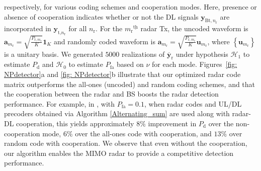 \documentclass[10pt,journal]{IEEEtran}
\newcommand{\paren}[1]{\left({#1}\right)}
\newcommand{\braces}[1]{{\left\{ {#1}\right\}}}
\newcommand{\ith}[1]    {{#1}^{\underline{\text{th}}}}
\newcommand{\rr}{_\mathrm{r}}
\theoremstyle{definition}
\begin{document}
		respectively, for various coding schemes and cooperation modes. Here, presence or absence of cooperation indicates whether or not the DL signals $\mathbf{y}_{\textrm{Bt},n\rr}$ are incorporated in $\mathbf{y}_{\textrm{t,}n\rr}$ for all $n\rr$. For the $\ith{m\rr}$ radar Tx, the uncoded waveform is $\mathbf{a}_{m\rr}=\sqrt{\frac{\mathit{P}_{\textrm{r},m\rr}}{\mathit{K}}}\mathbf{1}_{\mathit{K}}$ and randomly coded waveform is  $\mathbf{a}_{m\rr}=\sqrt{\frac{\mathit{P}_{\textrm{r},m\rr}}{\mathit{K}}}\mathbf{u}_{m\rr}$, where $\braces{\mathbf{u}_{m\rr}}$ is a unitary basis. We generated $5000$ realizations of $\overline{\mathbf{y}}_{\textrm{r}}$ under hypothesis $\mathcal{H}_1$ to estimate $\mathit{P}_{\textrm{d}}$ and $\mathcal{H}_0$ to estimate $\mathit{P}_{\textrm{fa}}$ based on $\nu$ for each mode. Figures~\ref{fig: NPdetector}a and \ref{fig: NPdetector}b illustrate that our optimized radar code matrix outperforms the all-ones (uncoded) and random coding schemes, and that the cooperation between the radar and BS boosts the radar detection performance. For example, in , with $P_{\textrm{fa}}=0.1$, when radar codes and UL/DL precoders obtained via Algorithm \ref{Alternating_sum} are used along with radar-DL cooperation, this yields approximately $8\%$ improvement in $P_{\textrm{d}}$ over the non-cooperation mode, $6\%$ over the all-ones code with cooperation, and $13\%$ over random code with cooperation. We observe that even without the cooperation, our algorithm enables the MIMO radar to provide a competitive detection performance.
		

\end{document}

